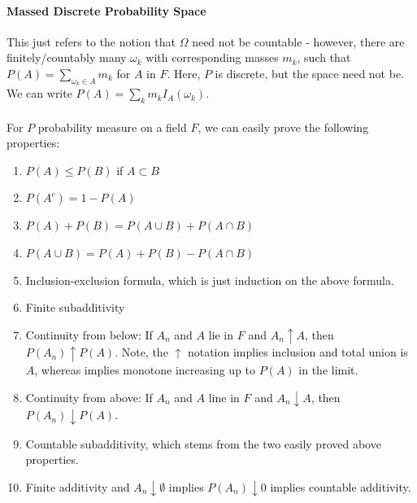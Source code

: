 \documentclass[12pt,a4paper]{article}
\newcommand{\1}[1]{\mathbbm{1}\left\{ #1 \right\}}
\begin{document}
\paragraph{Massed Discrete Probability Space} This just refers to the notion that $\Omega$ need not be countable - however, there are finitely/countably many $\omega_k$ with corresponding masses $m_k$, such that $P(A) = \sum_{\omega_k \in A} m_k$ for $A$ in $F$. Here, $P$ is discrete, but the space need not be. We can write $P(A) = \sum_k m_k I_A(\omega_k)$.
\\\\
For $P$ probability measure on a field $F$, we can easily prove the following properties:
\begin{enumerate}
	\item $P(A) \leq P(B)$ if $A \subset B$
	\item $P(A^c) = 1 - P(A)$
	\item $P(A) + P(B) = P(A \cup B) + P(A \cap B)$
	\item $P(A \cup B) = P(A) + P(B) - P(A \cap B)$
	\item Inclusion-exclusion formula, which is just induction on the above formula.
	\item Finite subadditivity
	\item Continuity from below: If $A_n$ and $A$ lie in $F$ and $A_n \uparrow A$, then $P(A_n) \uparrow P(A)$. Note, the $\uparrow$ notation implies inclusion and total union is $A$, whereas implies monotone increasing up to $P(A)$ in the limit.
	\item Continuity from above: If $A_n$ and $A$ line in $F$ and $A_n \downarrow A$, then $P(A_n) \downarrow P(A)$.
	\item Countable subadditivity, which stems from the two easily proved above properties.
	\item Finite additivity and $A_n \downarrow \emptyset$ implies $P(A_n) \downarrow 0$ implies countable additivity.
\end{enumerate}
\end{document}
